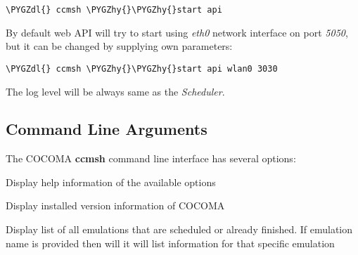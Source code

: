 \documentclass[letterpaper,10pt,english]{sphinxmanual}
\def\PYGZdl{\char`\$}
\def\PYGZhy{\char`\-}
\begin{document}
\begin{Verbatim}[commandchars=\\\{\}]
\PYGZdl{} ccmsh \PYGZhy{}\PYGZhy{}start api
\end{Verbatim}

By default web API will try to start using \emph{eth0} network interface on port \emph{5050}, but it can be changed by supplying own parameters:

\begin{Verbatim}[commandchars=\\\{\}]
\PYGZdl{} ccmsh \PYGZhy{}\PYGZhy{}start api wlan0 3030
\end{Verbatim}

The log level will be always same as the \emph{Scheduler}.


\subsection{Command Line Arguments}
\label{01_how_to_use_it:command-line-arguments}
The COCOMA \textbf{ccmsh} command line interface has several options:

\begin{fulllineitems}
\label{01_how_to_use_it:cmdoption-ccmsh-h}
Display help information of the available options

\end{fulllineitems}


\begin{fulllineitems}
\label{01_how_to_use_it:cmdoption-ccmsh-v}
Display installed version information of COCOMA

\end{fulllineitems}


\begin{fulllineitems}
\label{01_how_to_use_it:cmdoption-ccmsh-l}
Display list of all emulations that are scheduled or already finished. If emulation name is provided then will it will list information for that specific emulation

\end{fulllineitems}
\end{document}
